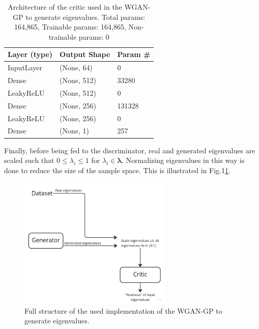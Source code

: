 \documentclass{article}
\begin{document}
\begin{table}[]
    \begin{tabular}{|l|l|l|}
        \hline
        \textbf{Layer (type)} & \textbf{Output Shape} & \textbf{Param \#} \\ \hline
        InputLayer            & (None, 64)            & 0                 \\ \hline
        Dense                 & (None, 512)           & 33280             \\ \hline
        LeakyReLU             & (None, 512)           & 0                 \\ \hline
        Dense                 & (None, 256)           & 131328            \\ \hline
        LeakyReLU             & (None, 256)           & 0                 \\ \hline
        Dense                 & (None, 1)             & 257               \\ \hline
    \end{tabular}
    \caption{Architecture of the critic used in the WGAN-GP to generate eigenvalues. Total params: 164,865, Trainable params: 164,865, Non-trainable params: 0}
    \label{tab:evals_critic_WGANGP_architecture}
\end{table}


Finally, before being fed to the discriminator, real and generated eigenvalues are scaled such that $0 \leq \lambda_i \leq 1$ for $\lambda_i \in \mathbf{\lambda}$. Normalizing eigenvalues in this way is done to reduce the size of the sample space. This is illustrated in Fig.1\ref{fig:evals_wgangp_full_structure}.

\begin{figure}
    \centering
    \includegraphics[width=0.65\textwidth]{../figs/evals_wgangp_full_structure.jpg}
    \caption{Full structure of the used implementation of the WGAN-GP to generate eigenvalues.}
    \label{fig:evals_wgangp_full_structure}
\end{figure}
\end{document}

